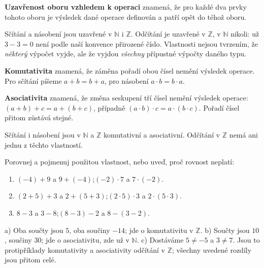 \documentclass[11pt,a4paper]{article}
\begin{document}
\begin{definiceBox}[title={Definice - Uzavřenost vzhledem k operaci}]
\textbf{Uzavřenost oboru vzhledem k operaci} znamená, že pro každé dva
prvky tohoto oboru je výsledek dané operace definován a patří opět do téhož oboru.
\end{definiceBox}

Sčítání a násobení jsou uzavřené v $\mathbb N$ i $\mathbb Z$.
Odčítání je uzavřené v $\mathbb Z$, v $\mathbb N$ nikoli:
už $3-3=0$ není podle naší konvence přirozené číslo.
Vlastnosti nejsou tvrzením, že \emph{některý} výpočet vyjde, ale že
vyjdou \emph{všechny} přípustné výpočty daného typu.

\begin{definiceBox}[title={Definice - Komutativita}]
\textbf{Komutativita} znamená, že záměna pořadí obou čísel nemění výsledek
operace. Pro sčítání píšeme $a+b=b+a$, pro násobení $a\cdot b=b\cdot a$.
\end{definiceBox}

\begin{definiceBox}[title={Definice - Asociativita}]
\textbf{Asociativita} znamená, že změna seskupení tří čísel nemění
výsledek operace: $(a+b)+c=a+(b+c)$, případně
$(a\cdot b)\cdot c=a\cdot(b\cdot c)$. Pořadí čísel přitom zůstává stejné.
\end{definiceBox}

Sčítání i násobení jsou v $\mathbb N$ a $\mathbb Z$ komutativní
a asociativní. Odčítání v $\mathbb Z$ nemá ani jednu z těchto vlastností.

\begin{prikladReseniBox}[title={Příklad 2},breakable=false]
Porovnej a pojmenuj použitou vlastnost, nebo uveď, proč rovnost neplatí:
\begin{enumerate}[label=\alph*)]
\item $(-4)+9$ a $9+(-4)$;\quad $(-2)\cdot7$ a $7\cdot(-2)$.
\item $(2+5)+3$ a $2+(5+3)$;\quad $(2\cdot5)\cdot3$ a $2\cdot(5\cdot3)$.
\item $8-3$ a $3-8$;\quad $(8-3)-2$ a $8-(3-2)$.
\end{enumerate}
\tcblower
a) Oba součty jsou $5$, oba součiny $-14$; jde o komutativitu v $\mathbb Z$.
b) Součty jsou $10$, součiny $30$; jde o asociativitu, zde už v $\mathbb N$.
c) Dostáváme $5\ne-5$ a $3\ne7$. Jsou to protipříklady komutativity
a asociativity odčítání v $\mathbb Z$; všechny uvedené rozdíly jsou přitom celé.
\end{prikladReseniBox}
\end{document}
